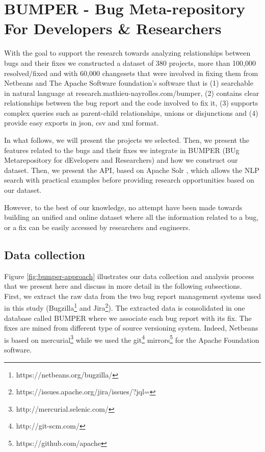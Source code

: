 
\section{BUMPER - Bug Meta-repository For Developers \& Researchers\label{sec:BUMPER}}

With the goal to support the research towards analyzing relationships between bugs and their fixes we constructed a dataset of 380 projects, more than 100,000 resolved/fixed and with 60,000 changesets that were involved in fixing them from Netbeans and The Apache Software foundation’s software that is (1) searchable in natural language at research.mathieu-nayrolles.com/bumper, (2) contains clear relationships between the bug report and the code involved to fix it, (3) supports complex queries such as parent-child relationships, unions or disjunctions and (4) provide easy exports in json, csv and xml format.

In what follows, we will present the projects we selected. Then, we present the features related to the bugs and their fixes we integrate in BUMPER (BUg Metarepository for dEvelopers and Researchers) and how we construct our dataset. Then, we present the API, based on Apache Solr \cite{Nayrolles2014b}, which allows the NLP search with practical examples before providing research opportunities based on our dataset.


However, to the best of our knowledge, no attempt have been made towards building an unified and online dataset where all the information related to a bug, or a fix can be easily accessed by researchers and engineers.

\subsection{Data collection}


Figure \ref{fig:bumper-approach} illustrates our data collection and analysis process that we present here and discuss in more detail in the following subsections. First, we extract the raw data from the two bug report management systems used in this study (Bugzilla\footnote{https://netbeans.org/bugzilla/} and Jira\footnote{https://issues.apache.org/jira/issues/?jql=}). The extracted data is consolidated in one database called BUMPER where we associate each bug report with its fix. The fixes are mined from different type of source versioning system. Indeed, Netbeans is based on mercurial\footnote{ http://mercurial.selenic.com/} while we used the git\footnote{http://git-scm.com/} mirrors\footnote{https://github.com/apache} for the Apache Foundation software.

